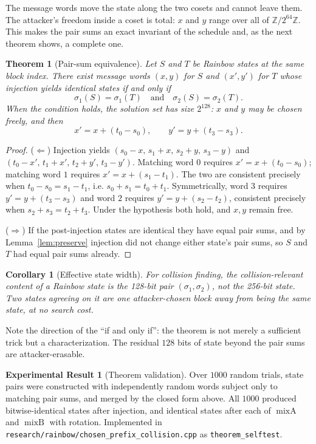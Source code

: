 \documentclass[10pt]{article}
\newtheorem{theorem}{Theorem}
\newtheorem{corollary}{Corollary}
\theoremstyle{definition}
\newtheorem{result}{Experimental Result}
\newcommand{\W}{\mathbb{Z}/2^{64}\mathbb{Z}}
\newcommand{\mixA}{\operatorname{mixA}}
\newcommand{\mixB}{\operatorname{mixB}}
\newcommand{\code}[1]{\texttt{#1}}
\begin{document}
The message words move the state along the two cosets and cannot leave them. The attacker's freedom inside a coset is total: $x$ and $y$ range over all of $\W$. This makes the pair sums an exact invariant of the schedule and, as the next theorem shows, a complete one.

\begin{theorem}[Pair-sum equivalence]
\label{thm:pairsum}
Let $S$ and $T$ be Rainbow states at the same block index. There exist message words $(x,y)$ for $S$ and $(x',y')$ for $T$ whose injection yields identical states if and only if
\[
  \sigma_1(S) = \sigma_1(T) \quad\text{and}\quad \sigma_2(S) = \sigma_2(T).
\]
When the condition holds, the solution set has size $2^{128}$: $x$ and $y$ may be chosen freely, and then
\[
  x' = x + (t_0 - s_0), \qquad y' = y + (t_3 - s_3).
\]
\end{theorem}

\begin{proof}
($\Leftarrow$) Injection yields $(s_0-x,\, s_1+x,\, s_2+y,\, s_3-y)$ and $(t_0-x',\, t_1+x',\, t_2+y',\, t_3-y')$. Matching word $0$ requires $x' = x + (t_0-s_0)$; matching word $1$ requires $x' = x + (s_1-t_1)$. The two are consistent precisely when $t_0-s_0 = s_1-t_1$, i.e. $s_0+s_1 = t_0+t_1$. Symmetrically, word $3$ requires $y' = y + (t_3-s_3)$ and word $2$ requires $y' = y + (s_2-t_2)$, consistent precisely when $s_2+s_3 = t_2+t_3$. Under the hypothesis both hold, and $x,y$ remain free.

($\Rightarrow$) If the post-injection states are identical they have equal pair sums, and by Lemma~\ref{lem:preserve} injection did not change either state's pair sums, so $S$ and $T$ had equal pair sums already.
\end{proof}

\begin{corollary}[Effective state width]
\label{cor:width}
For collision finding, the collision-relevant content of a Rainbow state is the 128-bit pair $(\sigma_1,\sigma_2)$, not the 256-bit state. Two states agreeing on it are one attacker-chosen block away from being the same state, at no search cost.
\end{corollary}

Note the direction of the ``if and only if'': the theorem is not merely a sufficient trick but a characterization. The residual $128$ bits of state beyond the pair sums are attacker-erasable.

\begin{result}[Theorem validation]
\label{res:theorem}
Over $1000$ random trials, state pairs were constructed with independently random words subject only to matching pair sums, and merged by the closed form above. All $1000$ produced bitwise-identical states after injection, and identical states after each of $\mixA$ and $\mixB$ with rotation. Implemented in \code{research/rainbow/chosen\_prefix\_collision.cpp} as \code{theorem\_selftest}.
\end{result}
\end{document}

